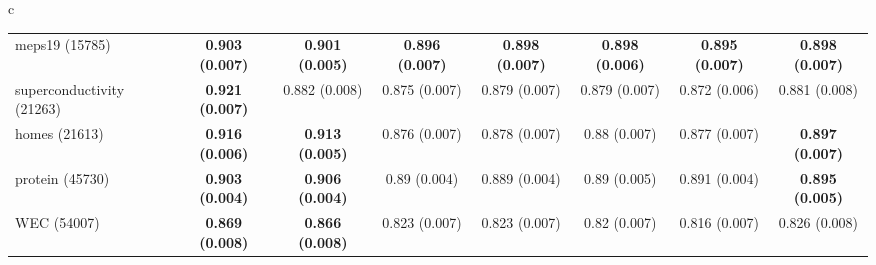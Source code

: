 \documentclass[border=6pt]{standalone}
\begin{document}
\begin{adjustbox}{max width=\linewidth}
\begin{tabular}{c}
\begin{tabular}{lccccccc}
meps19 (15785) & \textbf{0.903 (0.007)} & \textbf{0.901 (0.005)} & \textbf{0.896 (0.007)} & \textbf{0.898 (0.007)} & \textbf{0.898 (0.006)} & \textbf{0.895 (0.007)} & \textbf{0.898 (0.007)}\\
superconductivity (21263) & \textbf{0.921 (0.007)} & 0.882 (0.008) & 0.875 (0.007) & 0.879 (0.007) & 0.879 (0.007) & 0.872 (0.006) & 0.881 (0.008)\\
homes (21613) & \textbf{0.916 (0.006)} & \textbf{0.913 (0.005)} & 0.876 (0.007) & 0.878 (0.007) & 0.88 (0.007) & 0.877 (0.007) & \textbf{0.897 (0.007)}\\
protein (45730) & \textbf{0.903 (0.004)} & \textbf{0.906 (0.004)} & 0.89 (0.004) & 0.889 (0.004) & 0.89 (0.005) & 0.891 (0.004) & \textbf{0.895 (0.005)}\\
WEC (54007) & \textbf{0.869 (0.008)} & \textbf{0.866 (0.008)} & 0.823 (0.007) & 0.823 (0.007) & 0.82 (0.007) & 0.816 (0.007) & 0.826 (0.008)\\
\hline
\end{tabular}
\end{tabular}
\end{adjustbox}
\end{document}

